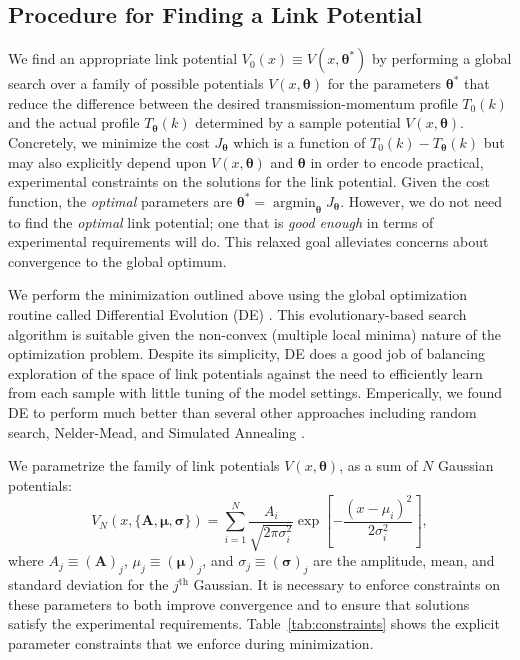 \documentclass[twocolumn,amsmath,amssymb,showpacs,prl,superscriptaddress,aps]{revtex4-1}
\DeclareMathOperator*{\argmin}{argmin}
\begin{document}
\subsection{Procedure for Finding a Link Potential}\label{sec:procedure_link}
We find an appropriate link potential $V_0(x) \equiv V(x,\bm{\theta}^*)$ by performing a global search over a family of possible potentials $V(x,\bm{\theta})$ for the parameters $\bm{\theta}^*$ that reduce the difference between the desired transmission-momentum profile $T_0(k)$ and the actual profile $T_{\bm\theta}(k)$ determined by a sample potential $V(x, \bm{\theta})$. Concretely, we minimize the cost $J_{\bm{\theta}}$ which is a function of $T_0(k) - T_{\bm{\theta}}(k)$ but may also explicitly depend upon $V(x,\bm{\theta})$ and $\bm{\theta}$ in order to encode practical, experimental constraints on the solutions for the link potential. Given the cost function, the {\it optimal} parameters are $\bm{\theta}^* = \argmin_{\bm{\theta}}J_{\bm\theta}$. However, we do not need to find the {\it optimal} link potential; one that is {\it good enough} in terms of experimental requirements will do. This relaxed goal alleviates concerns about convergence to the global optimum.

We perform the minimization outlined above using the global optimization routine called Differential Evolution (DE) \cite{original DE paper}. This evolutionary-based search algorithm is suitable given the non-convex (multiple local minima) nature of the optimization problem. Despite its simplicity, DE does a good job of balancing exploration of the space of link potentials against the need to efficiently learn from each sample with little tuning of the model settings. Emperically, we found DE to perform much better than several other approaches including random search, Nelder-Mead, and Simulated Annealing \cite{Tests performed using mathematica}.

We parametrize the family of link potentials $V(x, \bm{\theta})$, as a sum of $N$ Gaussian potentials:
\begin{equation}\label{eq:V-param}
V_N(x,\{\bm{A},\bm{\mu},\bm{\sigma} \}) = \sum_{i=1}^{N}\frac{A_i}{\sqrt{2\pi\sigma_i^2}}\exp\left[{-\frac{(x-\mu_i)^2}{2\sigma_i^2}}\right],
\end{equation}
where $A_j\equiv(\bm{A})_j$, $\mu_j\equiv(\bm{\mu})_j$, and $\sigma_j\equiv(\bm{\sigma})_j$ are the amplitude, mean, and standard deviation for the $j^{\mathrm{th}}$ Gaussian. It is necessary to enforce constraints on these parameters to both improve convergence and to ensure that solutions satisfy the experimental requirements. Table~\ref{tab:constraints} shows the explicit parameter constraints that we enforce  during minimization. 
\end{document}
